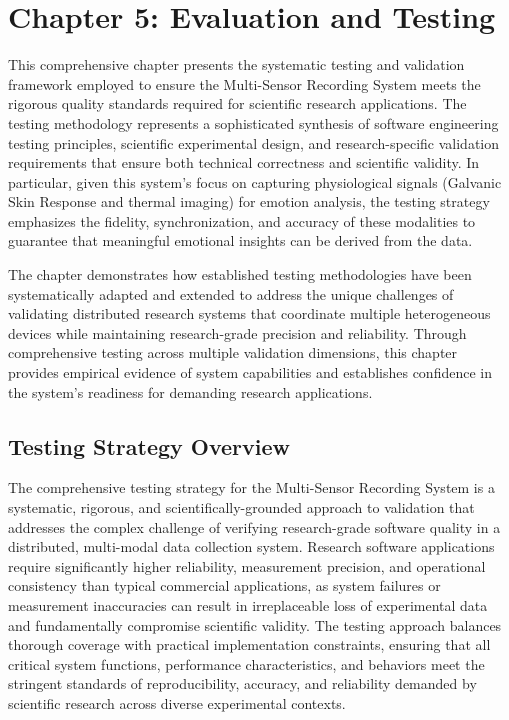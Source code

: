 \label{chap:5}

\chapter{Chapter 5: Evaluation and Testing}

This comprehensive chapter presents the systematic testing and
validation framework employed to ensure the Multi-Sensor Recording
System meets the rigorous quality standards required for scientific
research applications. The testing methodology represents a
sophisticated synthesis of software engineering testing principles,
scientific experimental design, and research-specific validation
requirements that ensure both technical correctness and scientific
validity. In particular, given this system's focus on capturing
physiological signals (Galvanic Skin Response and thermal imaging) for
emotion analysis, the testing strategy emphasizes the fidelity,
synchronization, and accuracy of these modalities to guarantee that
meaningful emotional insights can be derived from the data.

The chapter demonstrates how established testing methodologies have been
systematically adapted and extended to address the unique challenges of
validating distributed research systems that coordinate multiple
heterogeneous devices while maintaining research-grade precision and
reliability. Through comprehensive testing across multiple validation
dimensions, this chapter provides empirical evidence of system
capabilities and establishes confidence in the system's readiness for
demanding research applications.

\section{Testing Strategy Overview}

The comprehensive testing strategy for the Multi-Sensor Recording System
is a systematic, rigorous, and scientifically-grounded approach to
validation that addresses the complex challenge of verifying
research-grade software quality in a distributed, multi-modal data
collection system. Research software applications require significantly
higher reliability, measurement precision, and operational consistency
than typical commercial applications, as system failures or measurement
inaccuracies can result in irreplaceable loss of experimental data and
fundamentally compromise scientific validity. The testing approach
balances thorough coverage with practical implementation constraints,
ensuring that all critical system functions, performance
characteristics, and behaviors meet the stringent standards of
reproducibility, accuracy, and reliability demanded by scientific
research across diverse experimental contexts.

